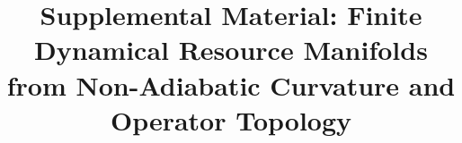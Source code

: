 \documentclass[aps,prx,reprint,superscriptaddress,longbibliography,floatfix]{revtex4-2}
\begin{document}
\title{Supplemental Material: Finite Dynamical Resource Manifolds from Non-Adiabatic Curvature and Operator Topology}

\maketitle













\end{document}
